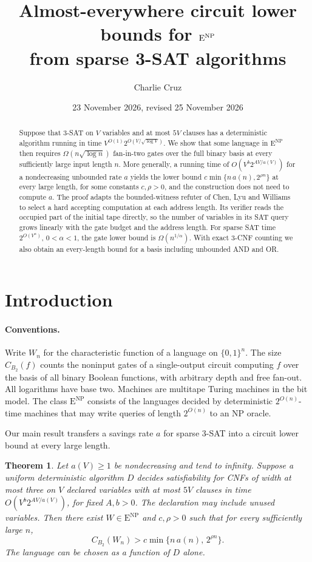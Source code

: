 \documentclass[12pt,letterpaper]{article}
\title{Almost-everywhere circuit lower bounds for \(\ENP\)\\from sparse 3-SAT algorithms}
\author{Charlie Cruz}
\date{23 November 2026, revised 25 November 2026}
\newtheorem{theorem}{Theorem}
\newcommand{\ENP}{\mathrm{E}^{\mathrm{NP}}}
\newcommand{\size}{C_{B_2}}
\newcommand{\bits}{\{0,1\}}
\begin{document}
\maketitle
\begin{abstract}
Suppose that 3-SAT on \(V\) variables and at most \(5V\) clauses has a
deterministic algorithm running in time \(V^{O(1)}2^{O(V/\sqrt{\log V})}\).
We show that some language in \(\ENP\) then requires
\(\Omega(n\sqrt{\log n})\) fan-in-two gates over the full binary basis at
every sufficiently large input length \(n\). More generally, a running time
of \(O(V^b2^{AV/a(V)})\) for a nondecreasing unbounded rate \(a\) yields the
lower bound \(c\min\{n\,a(n),2^{\rho n}\}\) at every large length, for some
constants \(c,\rho>0\), and the
construction does not need to compute \(a\). The proof adapts the
bounded-witness refuter of Chen, Lyu and Williams to select a hard accepting
computation at each address length. Its verifier reads the occupied part of
the initial tape directly, so the number of variables in its SAT query grows
linearly with the gate budget and the address length.
For sparse SAT time $2^{O(V^\alpha)}$, $0<\alpha<1$, the gate lower
bound is $\Omega(n^{1/\alpha})$. With exact 3-CNF counting we also
obtain an every-length bound for a basis including unbounded AND and OR.
\end{abstract}

\section{Introduction}\label{sec:intro}

\paragraph{Conventions.}
Write \(W_n\) for the characteristic function of a language on \(\bits^n\).
The size \(\size(f)\) counts the noninput gates of a single-output circuit
computing \(f\) over the basis of all binary Boolean functions, with
arbitrary depth and free fan-out. All logarithms have base two. Machines are
multitape Turing machines in the bit model. The class \(\ENP\) consists of
the languages decided by deterministic \(2^{O(n)}\)-time machines that may
write queries of length \(2^{O(n)}\) to an NP oracle.

Our main result transfers a savings rate \(a\) for sparse 3-SAT into a
circuit lower bound at every large length.

\begin{theorem}\label{thm:transfer}
Let \(a(V)\ge1\) be nondecreasing and tend to infinity. Suppose a uniform
deterministic algorithm \(D\) decides satisfiability for CNFs of width at
most three on \(V\) declared variables with at most \(5V\) clauses in time
\(O(V^b 2^{A V/a(V)})\), for fixed \(A,b>0\). The declaration may include
unused variables. Then there exist \(W\in\ENP\) and \(c,\rho>0\) such that
for every sufficiently large \(n\),
\[
       \size(W_n)>c\min\{n\,a(n),\,2^{\rho n}\}.
\]
The language can be chosen as a function of \(D\) alone.
\end{theorem}
\end{document}
